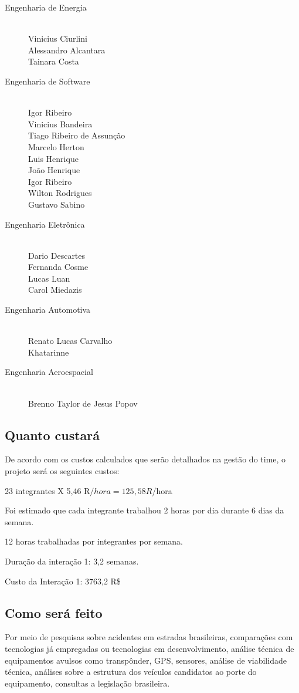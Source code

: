 \begin{description}
  \item[Engenharia de Energia] \hfill
  \\Vinicius Ciurlini
  \\Alessandro Alcantara
  \\Tainara Costa
  \item[Engenharia de Software] \hfill
  \\Igor Ribeiro
  \\Vinicius Bandeira
  \\Tiago Ribeiro de Assunção
  \\Marcelo Herton
  \\Luis Henrique
  \\João Henrique
  \\Igor Ribeiro
  \\Wilton Rodrigues
  \\Gustavo Sabino
  \item[Engenharia Eletrônica] \hfill
  \\Dario Descartes
  \\Fernanda Cosme
  \\Lucas Luan
  \\Carol Miedazis
  \item[Engenharia Automotiva] \hfill
  \\Renato Lucas Carvalho
  \\Khatarinne
  \item[Engenharia Aeroespacial] \hfill
  \\Brenno Taylor de Jesus Popov
\end{description}

\subsection{Quanto custará}
\label{sub:Quanto custará}
De acordo com os custos calculados que serão detalhados na gestão do time, o projeto será os seguintes custos:


23 integrantes X 5,46 R$/hora = 125,58 R$/hora


  Foi estimado que cada integrante trabalhou 2 horas por dia durante 6 dias da semana.

12 horas trabalhadas por integrantes por semana.

Duração da interação 1: 3,2 semanas.

Custo da Interação 1: 3763,2 R\$



\subsection{Como será feito}
Por meio de pesquisas sobre acidentes em estradas brasileiras, comparações com tecnologias já empregadas ou
tecnologias em desenvolvimento,  análise técnica de equipamentos avulsos como transpônder, GPS,  sensores,
análise de viabilidade técnica, análises sobre a estrutura dos veículos candidatos ao porte do equipamento,
consultas a legislação brasileira.
